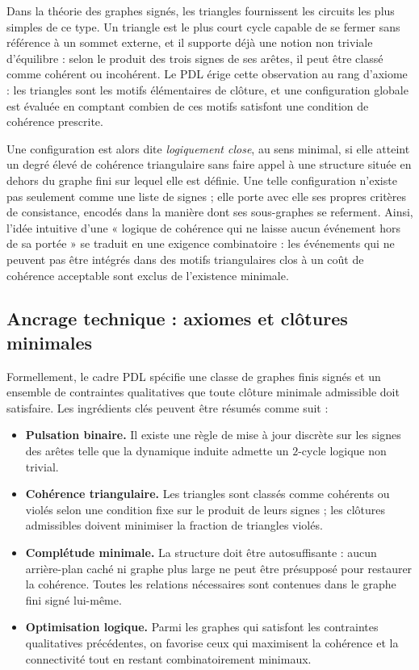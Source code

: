\documentclass[11pt,a4paper]{article}
\theoremstyle{definition}
\begin{document}
Dans la théorie des graphes signés, les triangles fournissent les circuits les plus simples de ce type. Un triangle est le plus court cycle capable de se fermer sans référence à un sommet externe, et il supporte déjà une notion non triviale d’équilibre : selon le produit des trois signes de ses arêtes, il peut être classé comme cohérent ou incohérent.\cite{Laubscher_EmergencePhysicalReality_2024,Laubscher_Leakage_Probability_2024} Le PDL érige cette observation au rang d’axiome : les triangles sont les motifs élémentaires de clôture, et une configuration globale est évaluée en comptant combien de ces motifs satisfont une condition de cohérence prescrite.

Une configuration est alors dite \emph{logiquement close}, au sens minimal, si elle atteint un degré élevé de cohérence triangulaire sans faire appel à une structure située en dehors du graphe fini sur lequel elle est définie.\cite{Laubscher_EmergencePhysicalReality_2024,Laubscher_MinimalClosures_46_2024} Une telle configuration n’existe pas seulement comme une liste de signes ; elle porte avec elle ses propres critères de consistance, encodés dans la manière dont ses sous-graphes se referment. Ainsi, l’idée intuitive d’une « logique de cohérence qui ne laisse aucun événement hors de sa portée » se traduit en une exigence combinatoire : les événements qui ne peuvent pas être intégrés dans des motifs triangulaires clos à un coût de cohérence acceptable sont exclus de l’existence minimale.

\subsection{Ancrage technique : axiomes et clôtures minimales}

Formellement, le cadre PDL spécifie une classe de graphes finis signés et un ensemble de contraintes qualitatives que toute clôture minimale admissible doit satisfaire.\cite{Laubscher_IntroPDL_2024,Laubscher_EmergencePhysicalReality_2024,Laubscher_MinimalClosures_46_2024,Laubscher_PDL_Position_2024} Les ingrédients clés peuvent être résumés comme suit :

\begin{itemize}
\item \textbf{Pulsation binaire.} Il existe une règle de mise à jour discrète sur les signes des arêtes telle que la dynamique induite admette un \(2\)-cycle logique non trivial.
\item \textbf{Cohérence triangulaire.} Les triangles sont classés comme cohérents ou violés selon une condition fixe sur le produit de leurs signes ; les clôtures admissibles doivent minimiser la fraction de triangles violés.
\item \textbf{Complétude minimale.} La structure doit être autosuffisante : aucun arrière-plan caché ni graphe plus large ne peut être présupposé pour restaurer la cohérence. Toutes les relations nécessaires sont contenues dans le graphe fini signé lui-même.
\item \textbf{Optimisation logique.} Parmi les graphes qui satisfont les contraintes qualitatives précédentes, on favorise ceux qui maximisent la cohérence et la connectivité tout en restant combinatoirement minimaux.
\end{itemize}
\end{document}
